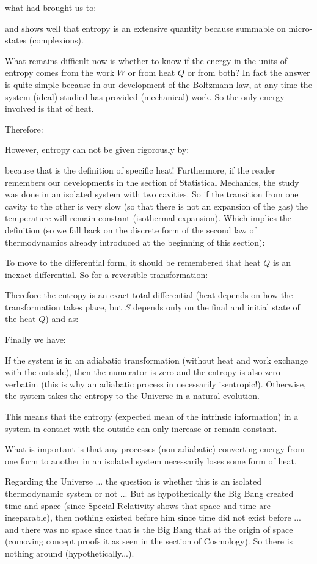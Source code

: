 	what had brought us to:
	
	and shows well that entropy is an extensive quantity because summable on micro-states (complexions).

	What remains difficult now is whether to know if the energy in the units of entropy comes from the work $W$ or from heat $Q$ or from both? In fact the answer is quite simple because in our development of the Boltzmann law, at any time the system (ideal) studied has provided (mechanical) work. So the only energy involved is that of heat.

	Therefore:
	
	However, entropy can not be given rigorously by:
	
	because that is the definition of specific heat! Furthermore, if the reader remembers our developments in the section of Statistical Mechanics, the study was done in an isolated system with two cavities. So if the transition from one cavity to the other is very slow (so that there is not an expansion of the gas) the temperature will remain constant (isothermal expansion). Which implies the definition (so we fall back on the discrete form of the second law of thermodynamics already introduced at the beginning of this section):
	
	To move to the differential form, it should be remembered that heat $Q$ is an inexact differential. So for a reversible transformation:
	
	Therefore the entropy is an exact total differential (heat depends on how the transformation takes place, but $S$ depends only on the final and initial state of the heat $Q$) and as:
	
	Finally we have:
	
	If the system is in an adiabatic transformation (without heat and work exchange with the outside), then the numerator is zero and the entropy is also zero verbatim (this is why an adiabatic process in necessarily isentropic!). Otherwise, the system takes the entropy to the Universe in a natural evolution.
	
	This means that the entropy (expected mean of the intrinsic information) in a system in contact with the outside can only increase or remain constant.

	What is important is that any processes (non-adiabatic) converting energy from one form to another in an isolated system necessarily loses some form of heat.

	Regarding the Universe ... the question is whether this is an isolated thermodynamic system or not ... But as hypothetically the Big Bang created time and space (since Special Relativity shows that space and time are inseparable), then nothing existed before him since time did not exist before ... and there was no space since that is the Big Bang that at the origin of space (comoving concept proofs it as seen in the section of Cosmology). So there is nothing around (hypothetically...).

